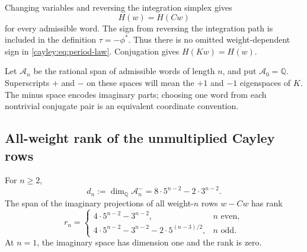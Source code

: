 Changing variables and reversing the integration simplex gives
\begin{equation}\label{cayley:eq:period-law}
 H(w)=H(Cw)
\end{equation}
for every admissible word.  The sign from reversing the integration path
is included in the definition $\tau=-\phi^*$.  Thus there is no omitted
weight-dependent sign in \eqref{cayley:eq:period-law}.  Conjugation gives
$H(Kw)=\overline{H(w)}$.

Let $\mathcal A_n$ be the rational span of admissible words of length $n$,
and put $\mathcal A_0=\mathbb Q$.  Superscripts $+$ and $-$ on these spaces
will mean the $+1$ and $-1$ eigenspaces of $K$.  The minus space encodes
imaginary parts; choosing one word from each nontrivial conjugate pair is
an equivalent coordinate convention.

\subsection{All-weight rank of the unmultiplied Cayley rows}

\begin{theorem}\label{cayley:thm:raw}
For $n\ge2$,
\[
 d_n:=\dim_{\mathbb Q}\mathcal A_n^-
 =8\cdot5^{n-2}-2\cdot3^{n-2}.
\]
The span of the imaginary projections of all weight-$n$ rows $w-Cw$
has rank
\begin{equation}\label{cayley:eq:raw-rank}
 r_n=
 \begin{cases}
 4\cdot5^{n-2}-3^{n-2},&n\text{ even},\\[2mm]
 4\cdot5^{n-2}-3^{n-2}-2\cdot5^{(n-3)/2},&n\text{ odd}.
 \end{cases}
\end{equation}
At $n=1$, the imaginary space has dimension one and the rank is zero.
\end{theorem}

